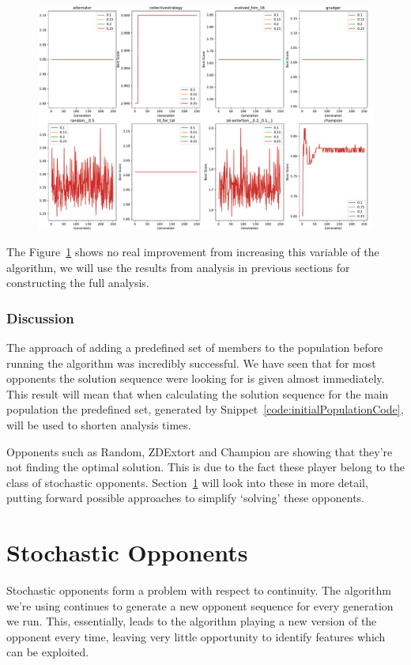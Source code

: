 \begin{figure}[ht]
    \includegraphics[width=1.0\textwidth, center]{./img/plots/NEW_MUT_FREQ_bs_v_gen_all.pdf}
    \caption{}\label{fig:NEW-MUT-FREQ-bs-gen-all}
\end{figure}

The Figure~\ref{fig:NEW-MUT-FREQ-bs-gen-all} shows no real improvement from increasing this variable of the algorithm, we will use the results from analysis in previous sections for constructing the full analysis.

\subsubsection{Discussion}\label{subsubsec:discussion}
The approach of adding a predefined set of members to the population before running the algorithm was incredibly successful.
We have seen that for most opponents the solution sequence were looking for is given almost immediately.
This result will mean that when calculating the solution sequence for the main population the predefined set, generated by Snippet~\ref{code:initialPopulationCode}, will be used to shorten analysis times.

Opponents such as Random, ZDExtort and Champion are showing that they're not finding the optimal solution.
This is due to the fact these player belong to the class of stochastic opponents.
Section~\ref{sec:stochasticOpponents} will look into these in more detail, putting forward possible approaches to simplify `solving' these opponents.

\section{Stochastic Opponents}\label{sec:stochasticOpponents}
Stochastic opponents form a problem with respect to continuity.
The algorithm we're using continues to generate a new opponent sequence for every generation we run.
This, essentially, leads to the algorithm playing a new version of the opponent every time, leaving very little opportunity to identify features which can be exploited.

